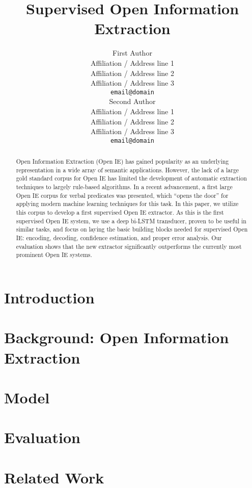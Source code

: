 \documentclass[11pt,a4paper]{article}
\title{Supervised Open Information Extraction}
\author{First Author \\
  Affiliation / Address line 1 \\
  Affiliation / Address line 2 \\
  Affiliation / Address line 3 \\
  {\tt email@domain} \\\And
  Second Author \\
  Affiliation / Address line 1 \\
  Affiliation / Address line 2 \\
  Affiliation / Address line 3 \\
  {\tt email@domain} \\}
\date{}
\begin{document}
\maketitle
\begin{abstract}
  Open Information Extraction (Open IE) has gained popularity as an underlying representation in a
  wide array of semantic applications.
  However, the lack of a large gold standard corpus for Open IE has
  limited the development of automatic extraction techniques to largely rule-based algorithms.
  In a recent advancement, a first large Open IE corpus for verbal predicates was presented, which ``opens the door'' for applying modern machine learning techniques for this task.
  In this paper, we utilize this corpus to develop a first supervised Open IE extractor.
  As this is the first supervised Open IE system,
  we use a deep bi-LSTM transducer, proven to be useful in similar tasks, and focus on laying the basic building blocks needed for supervised Open IE: encoding, decoding, confidence estimation, and proper error analysis.
  Our evaluation shows that the new extractor significantly outperforms
  the currently most prominent Open IE systems.
\end{abstract}

\section{Introduction}
\label{sec:introduction}



\section{Background: Open Information Extraction}
\label{sec:background}




\section{Model}
\label{sec:model}


\section{Evaluation}
\label{sec:evaluation}


\section{Related Work}
\label{sec:related}

\end{document}
